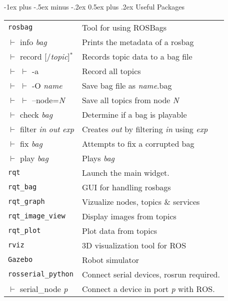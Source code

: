 \documentclass[10pt,letterpaper]{article}
\makeatletter
\renewcommand\section{\@startsection{section}{1}{0mm}%
                                {-1ex plus -.5ex minus -.2ex}%
                                {0.5ex plus .2ex}%
                                {\normalfont\large\bfseries}
                      }%
\makeatother
\begin{document}
\begin{multicols}{3}
\section{Useful Packages}
\begin{tabular}{@{}ll@{}}
\verb!rosbag! & Tool for using ROSBags \\
$\vdash $ info \textit{bag} & Prints the metadata of a rosbag  \\
$\vdash $ record [/\textit{topic}]$^*$ & Records topic data to a bag file \\
$\vdash $ $\vdash $ -a & Record all topics  \\
$\vdash $ $\vdash $ -O \textit{name} & Save bag file as \textit{name}.bag \\
$\vdash $ $\vdash $ --node=\textit{N} & Save all topics from node \textit{N}\\
$\vdash $ check \textit{bag} & Determine if a bag is playable \\
$\vdash $ filter \textit{in} \textit{out} \textit{exp} & Creates \textit{out} by filtering \textit{in} using \textit{exp} \\
$\vdash $ fix \textit{bag} & Attempts to fix a corrupted bag \\
$\vdash $ play \textit{bag} & Plays \textit{bag}  \\

\verb!rqt! & Launch the main widget.\\
\verb!rqt_bag! & GUI for handling rosbags \\
\verb!rqt_graph! & Vizualize nodes, topics \& services\\
\verb!rqt_image_view! & Display images from topics \\
\verb!rqt_plot! & Plot data from topics \\

\verb!rviz! & 3D visualization tool for ROS\\

\verb!Gazebo! & Robot simulator\\

\verb!rosserial_python! & Connect serial devices, rosrun required. \\
$\vdash $ serial\_node \textit{p} & Connect a device in port \textit{p} with ROS. \\


\end{tabular}



\end{multicols}
\end{document}
